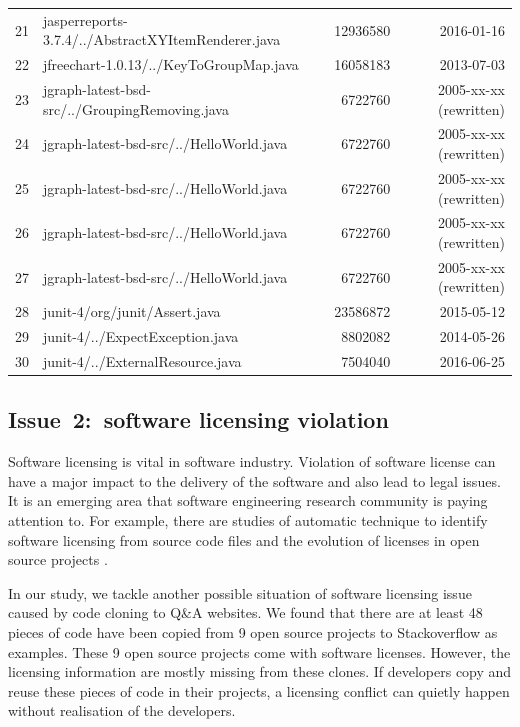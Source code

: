 \documentclass{sig-alternate-05-2015}
\begin{document}
\begin{table}
\begin{tabular}{r|l|r|r}
		21 & jasperreports-3.7.4/../AbstractXYItemRenderer.java & 12936580 & 2016-01-16 \\
		22 & jfreechart-1.0.13/../KeyToGroupMap.java & 16058183 & 2013-07-03 \\
		23 & jgraph-latest-bsd-src/../GroupingRemoving.java & 6722760 & 2005-xx-xx (rewritten) \\
		24 & jgraph-latest-bsd-src/../HelloWorld.java & 6722760 & 2005-xx-xx (rewritten) \\
		25 & jgraph-latest-bsd-src/../HelloWorld.java & 6722760 & 2005-xx-xx (rewritten) \\
		26 & jgraph-latest-bsd-src/../HelloWorld.java & 6722760 & 2005-xx-xx (rewritten) \\
		27 & jgraph-latest-bsd-src/../HelloWorld.java & 6722760 & 2005-xx-xx (rewritten) \\
		28 & junit-4/org/junit/Assert.java & 23586872 & 2015-05-12 \\
		29 & junit-4/../ExpectException.java & 8802082 & 2014-05-26 \\
		30 & junit-4/../ExternalResource.java & 7504040 & 2016-06-25 \\
		\hline
	\end{tabular} 
\end{table}

\subsection{Issue~2:~software licensing violation}
Software licensing is vital in software industry. Violation of software license can have a major impact to the delivery of the software and also lead to legal issues. It is an emerging area that software engineering research community is paying attention to. For example, there are studies of automatic technique to identify software licensing from source code files \cite{German2010} and the evolution of licenses in open source projects \cite{DiPenta2010}.

In our study, we tackle another possible situation of software licensing issue caused by code cloning to Q\&A websites. We found that there are at least 48 pieces of code have been copied from 9 open source projects to Stackoverflow as examples. These 9 open source projects come with software licenses. However, the licensing information are mostly missing from these clones. If developers copy and reuse these pieces of code in their projects, a licensing conflict can quietly happen without realisation of the developers. 
\end{document}
